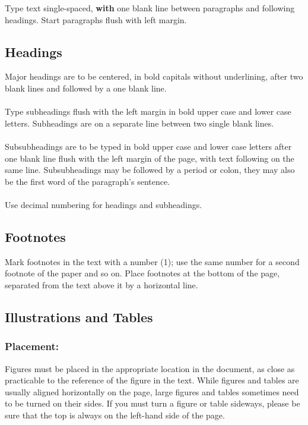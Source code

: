 \documentclass{isprs}
\begin{document}
Type text single-spaced, \textbf{with} one blank line between paragraphs and 
following headings. Start paragraphs flush with left margin.


\subsection{Headings}\label{sec:Headings}

Major headings are to be centered, in bold capitals without 
underlining, after two blank lines and followed by a one blank line.\\
\\
Type subheadings flush with the left margin in bold upper case and lower 
case letters. Subheadings are on a separate line between two single blank lines.\\
 \\
Subsubheadings are to be typed in bold upper case and lower case letters 
after one blank line flush with the left margin of the page, with text 
following on the same line. Subsubheadings may be followed by a period 
or colon, they may also be the first word of the paragraph's sentence.\\
 \\
Use decimal numbering for headings and subheadings.


\subsection{Footnotes}\label{sec:Footnotes}

Mark footnotes in the text with a number (1); use the same number for a 
second footnote of the paper and so on. Place footnotes at the bottom of 
the page, separated from the text above it by a horizontal line.


\subsection{Illustrations and Tables}\label{sec:Illustrations and Tables}

\subsubsection{Placement:}\label{sec:Placement}

Figures must be placed in the appropriate location in the document, 
as close as practicable to the reference of the figure in the text. 
While figures and tables are usually aligned horizontally on the page, 
large figures and tables sometimes need to be turned on their sides. 
If you must turn a figure or table sideways, please be sure that the 
top is always on the left-hand side of the page.
\end{document}
